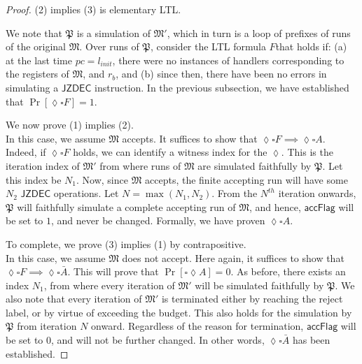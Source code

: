 \documentclass{article}
\theoremstyle{remark}
\newcommand{\program}{\mathfrak{P}}
\newcommand{\machine}{\mathfrak{M}}
\newcommand{\jzdec}{\mathsf{JZDEC}}
\newcommand{\accflag}{\mathsf{accFlag}}
\begin{document}
\begin{proof}
(2) implies (3) is elementary LTL.

We note that $\program$ is a simulation of $\machine'$, which in turn is a loop of prefixes of runs of the original $\machine$. Over runs of $\program$, consider the LTL formula $F$\footnotemark that holds if: (a) at the last time $pc = l_{init}$, there were no instances of handlers corresponding to the registers of $\machine$, and $r_b$, and (b) since then, there have been no errors in simulating a $\jzdec$ instruction. 
%
In the previous subsection, we have established that $\Pr[\lozenge\square F] = 1$.
\footnotemark


We now prove (1) implies (2). \\
In this case, we assume $\machine$ accepts. It suffices to show that $\lozenge\square F \implies \lozenge\square A$. Indeed, if $\lozenge\square F$ holds, we can identify a witness index for the $\lozenge$. This is the iteration index of $\machine'$ from where runs of $\machine$ are simulated faithfully by $\program$. Let this index be $N_1$. Now, since $\machine$ accepts, the finite accepting run will have some $N_2$ $\jzdec$ operations. Let $N = \max(N_1, N_2)$. From the $N^{th}$ iteration onwards, $\program$ will faithfully simulate a complete accepting run of $\machine$, and hence, $\accflag$ will be set to $1$, and never be changed. Formally, we have proven $\lozenge \square A$.

To complete, we prove (3) implies (1) by contrapositive. \\
In this case, we assume $\machine$ does not accept. Here again, it suffices to show that $\lozenge\square F \implies \lozenge\square \bar{A}$. This will prove that $\Pr[\square \lozenge A] = 0$. As before, there exists an index $N_1$, from where every iteration of $\machine'$ will be simulated faithfully by $\program$. We also note that every iteration of $\machine'$ is terminated either by reaching the reject label, or by virtue of exceeding the budget. This also holds for the simulation by $\program$ from iteration $N$ onward. Regardless of the reason for termination, $\accflag$ will be set to $0$, and will not be further changed. In other words, $\lozenge\square \bar{A}$ has been established. 
\end{proof}
\end{document}
